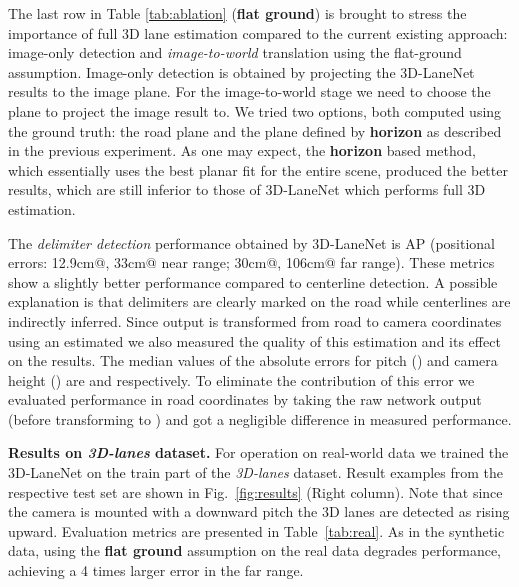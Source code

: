 \documentclass[10pt,twocolumn,letterpaper]{article}
\begin{document}
The last row in Table \ref{tab:ablation} (\textbf{flat ground}) is brought to stress the importance of full 3D lane estimation compared to the current existing approach: image-only detection and \textit{image-to-world} translation using the flat-ground assumption. Image-only detection is obtained by projecting the 3D-LaneNet results to the image plane. For the image-to-world stage we need to choose the plane to project the image result to. We tried two options, both computed using the ground truth: the road plane  and the plane defined by \textbf{horizon} as described in the previous experiment. As one may expect, the \textbf{horizon} based method, which essentially uses the best planar fit for the entire scene, produced the better results, which are still inferior to those of 3D-LaneNet which performs full 3D estimation.



The \textit{delimiter detection} performance obtained by 3D-LaneNet is  AP (positional errors: 12.9cm@, 33cm@ near range;  30cm@, 106cm@ far range). These metrics show a slightly better performance compared to centerline detection. A possible explanation is that delimiters are clearly marked on the road while centerlines are indirectly inferred. Since output is transformed from road to camera coordinates using an estimated  we also measured the quality of this estimation and its effect on the results. The median values of the absolute errors for pitch () and camera height () are  and  respectively. To eliminate the contribution of this error we evaluated performance in road coordinates  by taking the raw network output (before transforming to ) and got a negligible difference in measured performance.

\textbf{Results on \textit{3D-lanes} dataset.} For operation on real-world data we trained the 3D-LaneNet on the train part of the \textit{3D-lanes} dataset. Result examples from the respective test set are shown in Fig.~\ref{fig:results} (Right column). Note that since the camera is mounted with a downward pitch the 3D lanes are detected as rising upward. Evaluation metrics are presented in Table~\ref{tab:real}. As in the synthetic data, using the \textbf{flat ground} assumption on the real data degrades performance, achieving a 4 times larger error in the far range.
\end{document}

